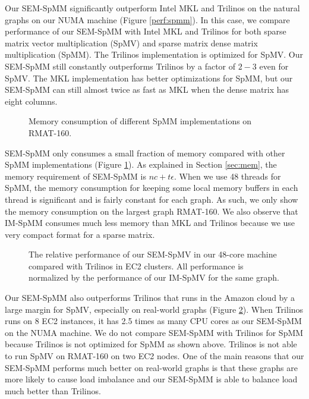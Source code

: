 Our SEM-SpMM significantly outperform Intel MKL and Trilinos on the natural
graphs on our NUMA machine (Figure \ref{perf:spmm}). In this case, we compare
performance of our SEM-SpMM with Intel MKL and Trilinos for both sparse matrix
vector multiplication (SpMV) and sparse matrix dense matrix multiplication (SpMM).
The Trilinos implementation is optimized for SpMV. Our SEM-SpMM still
constantly outperforms Trilinos by a factor of $2-3$ even for SpMV. The MKL
implementation has better optimizations for SpMM, but our SEM-SpMM can still
almost twice as fast as MKL when the dense matrix has eight columns.

\begin{figure}
	\begin{center}
		\footnotesize
		
		\caption{Memory consumption of different SpMM implementations on
		RMAT-160.}
		\label{perf:spmm_mem}
	\end{center}
\end{figure}

SEM-SpMM only consumes a small fraction of memory compared with other SpMM
implementations (Figure \ref{perf:spmm_mem}). As explained in Section
\ref{sec:mem}, the memory requirement of SEM-SpMM is $n c + t \epsilon$.
When we use 48 threads for SpMM, the memory consumption for keeping some
local memory buffers in each thread is significant and is fairly constant
for each graph. As such, we only show the memory consumption on the largest
graph RMAT-160. We also observe that IM-SpMM consumes much less memory than
MKL and Trilinos because we use very compact format for a sparse matrix.

\begin{figure}
	\begin{center}
		\footnotesize
		
		\caption{The relative performance of our SEM-SpMV in our 48-core
			machine compared with Trilinos in EC2 clusters. All performance
			is normalized by the performance of our IM-SpMV for the same
			graph.}
		\label{perf:ec2}
	\end{center}
\end{figure}

Our SEM-SpMM also outperforms Trilinos that runs in the Amazon cloud by a large
margin for SpMV, especially on real-world graphs (Figure \ref{perf:ec2}).
When Trilinos runs on 8 EC2 instances, it has 2.5 times as many CPU cores as
our SEM-SpMM on the NUMA machine. We do not compare SEM-SpMM with Trilinos
for SpMM because Trilinos is not optimized for SpMM as shown above. Trilinos
is not able to run SpMV on RMAT-160 on two EC2 nodes.
One of the main reasons that our SEM-SpMM performs much
better on real-world graphs is that these graphs are more likely to cause
load imbalance and our SEM-SpMM is able to balance load much better than
Trilinos.

